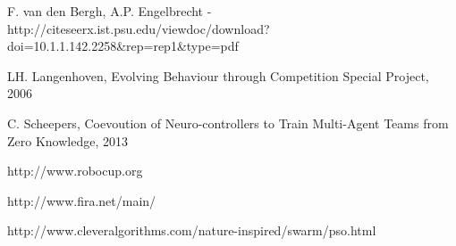 \begin{thebibliography}{9}
F. van den Bergh, A.P. Engelbrecht - http://citeseerx.ist.psu.edu/viewdoc/download?doi=10.1.1.142.2258&rep=rep1&type=pdf

LH. Langenhoven, Evolving Behaviour through Competition Special Project, 2006

C. Scheepers, Coevoution of Neuro-controllers to Train Multi-Agent Teams from Zero Knowledge, 2013


http://www.robocup.org

http://www.fira.net/main/

http://www.cleveralgorithms.com/nature-inspired/swarm/pso.html

\end{thebibliography}

